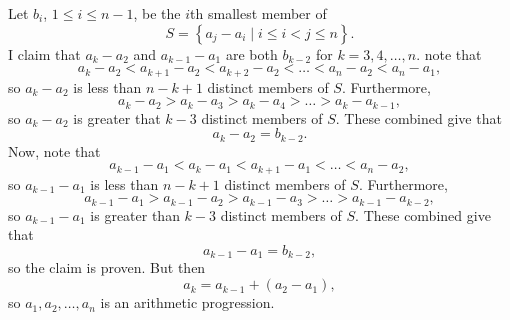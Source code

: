 Let $b_i$, $1\leq i\leq n-1$, be the $i$th smallest member of \[S=\left\{a_j-a_i\mid i\leq i<j\leq n\right\}.\] I claim that $a_k-a_2$ and $a_{k-1}-a_1$ are both $b_{k-2}$ for $k=3,4,\ldots,n$. note that \[a_k-a_2<a_{k+1}-a_2<a_{k+2}-a_2<\ldots<a_n-a_2<a_n-a_1,\] so $a_k-a_2$ is less than $n-k+1$ distinct members of $S$. Furthermore, \[a_k-a_2>a_k-a_3>a_k-a_4>\ldots>a_k-a_{k-1},\] so $a_k-a_2$ is greater that $k-3$ distinct members of $S$. These combined give that \[a_k-a_2=b_{k-2}.\] Now, note that \[a_{k-1}-a_1<a_k-a_1<a_{k+1}-a_1<\ldots<a_n-a_2,\] so $a_{k-1}-a_1$ is less than $n-k+1$ distinct members of $S$. Furthermore, \[a_{k-1}-a_1>a_{k-1}-a_2>a_{k-1}-a_3>\ldots>a_{k-1}-a_{k-2},\] so $a_{k-1}-a_1$ is greater than $k-3$ distinct members of $S$. These combined give that \[a_{k-1}-a_1=b_{k-2},\] so the claim is proven. But then \[a_k=a_{k-1}+\left(a_2-a_1\right),\] so $a_1,a_2,\ldots,a_n$ is an arithmetic progression.